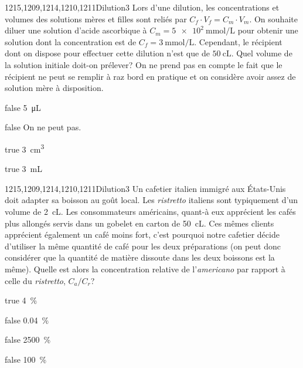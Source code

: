 \documentclass[11pt]{article}
\begin{document}
			\begin{question}{1215,1209,1214,1210,1211}{Dilution}{3}{}
				Lors d'une dilution, les concentrations et volumes des solutions mères et filles sont reliés par $C_f\cdot V_f = C_m\cdot V_m$. On souhaite diluer une solution d'acide ascorbique à $C_m = \SI{5e2}{\milli\mole\per\liter}$ pour obtenir une solution dont la concentration est de $C_f = \SI{3}{\milli\mole\per\liter}$. Cependant, le récipient dont on dispose pour effectuer cette dilution n'est que de $\SI{50}{\centi\liter}$. Quel volume de la solution initiale doit-on prélever? On ne prend pas en compte le fait que le récipient ne peut se remplir à raz bord en pratique et on considère avoir assez de solution mère à disposition.
			\end{question}
			\begin{reponses} 
				\item[false] \SI{5}{\micro\liter}
				\item[false] On ne peut pas.
				\item[true] \SI{3}{\centi\meter\cubed}
				\item[true] \SI{3}{\milli\liter}
			\end{reponses}
			\begin{question}{1215,1209,1214,1210,1211}{Dilution}{3}{}
			Un cafetier italien immigré aux États-Unis doit adapter sa boisson au goût local. Les \textit{ristretto} italiens sont typiquement d'un volume de \SI{2}{\centi\liter}. Les consommateurs américains, quant-à eux apprécient les cafés plus allongés servis dans un gobelet en carton de \SI{50}{\centi\liter}. Ces mêmes clients apprécient également un café moins fort, c'est pourquoi notre cafetier décide d'utiliser la même quantité de café pour les deux préparations (on peut donc considérer que la quantité de matière dissoute dans les deux boissons est la même). Quelle est alors la concentration relative de l'\textit{americano} par rapport à celle du \textit{ristretto}, $C_a/C_r$?
			\end{question}
			\begin{reponses} 
				\item[true] \SI{4}{\percent}
				\item[false] \SI{0.04}{\percent}
				\item[false] \SI{2500}{\percent}
					\item[false] \SI{100}{\percent}
			\end{reponses}
		
\end{document}
